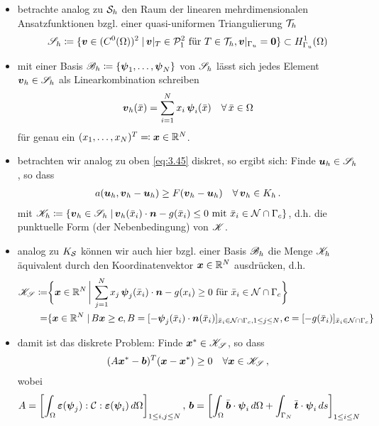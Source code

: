 \begin{itemize}
\item betrachte analog zu $\mathcal S_h$ den Raum der linearen mehrdimensionalen Ansatzfunktionen bzgl. einer quasi-uniformen Triangulierung $\mathcal T_h$
\begin{align}
	 \mathscr S_h \coloneqq \{\boldsymbol v \in (C^0(\Omega))^2 \;\vert\, \boldsymbol v|_T \in \mathcal P_1^2 \text{ für } T \in \mathcal T_h, \boldsymbol v|_{\Gamma_u} = \boldsymbol 0\} \subset H^1_{\Gamma_u} (\Omega)
\end{align}

\item mit einer Basis $\mathscr B_h \coloneqq \{\boldsymbol\psi_1,\ldots,\boldsymbol \psi_N\}$ von $\mathscr S_h$ lässt sich jedes Element $\boldsymbol v_h \in \mathscr S_h$ als Linearkombination schreiben
\begin{align}
	\boldsymbol v_h(\bar x) = \sum_{i = 1}^N x_i \, \boldsymbol \psi_i(\bar x) \quad \forall \, \bar x \in \Omega
\end{align}
für genau ein $(x_1,\ldots,x_N)^T \eqqcolon \boldsymbol x \in \mathbb{R}^N$.

\item betrachten wir analog zu oben \eqref{eq:3.45} diskret, so ergibt sich: Finde $\boldsymbol u_h \in \mathscr S_h$, so dass
\begin{align}
	a(\boldsymbol u_h, \boldsymbol v_h - \boldsymbol u_h) \ge F(\boldsymbol v_h- \boldsymbol u_h) \quad \forall \, \boldsymbol v_h \in K_h \, .
\end{align}
mit $\mathscr K_h \coloneqq \{  \boldsymbol v_h \in \mathscr S_h \;\vert\, \boldsymbol v_h(\bar x_i) \cdot \boldsymbol n - g(\bar x_i) \le 0 \text{ mit } \bar x_i \in \mathcal N \cap \Gamma_c\}$, d.h. die punktuelle Form (der Nebenbedingung) von $\mathscr K$.

\item analog zu $K_{\mathcal S}$ können wir auch hier bzgl. einer Basis $\mathscr B_h$ die Menge $\mathscr K_h$ äquivalent durch den Koordinatenvektor $\boldsymbol x \in \mathbb{R}^N$ ausdrücken, d.h.
\begin{align*}
	\mathscr K_{\mathscr S}  \coloneqq& \bigg\{ \boldsymbol x \in \mathbb{R}^N \,\bigg| \, \sum_{j=1}^N x_j \, \boldsymbol \psi_j(\bar x_i) \cdot \boldsymbol n- g(x_i) \ge 0 \text{ für } \bar x_i \in \mathcal N \cap \Gamma_c\bigg\} \\
	=& \{ \boldsymbol x \in \mathbb{R}^N \;\vert\, B\boldsymbol x \ge \boldsymbol c , B =  [-\boldsymbol \psi_j(\bar x_i)\cdot \boldsymbol n(\bar x_i)]_{\bar x_i \in \mathcal N \cap \Gamma_c, 1\le j \le N} ,\boldsymbol c = [-g(\bar x_i)]_{\bar x_i \in\mathcal N \cap \Gamma_c}\}
\end{align*}

\item damit ist das diskrete Problem: Finde $\boldsymbol x^* \in \mathscr K_{\mathscr S}$, so dass
\begin{align}\label{eq:3.50}
	(A\boldsymbol x^* - \boldsymbol b)^T (\boldsymbol x - \boldsymbol x^*) \ge 0 \quad \forall \boldsymbol x\in \mathscr K_{\mathscr S} \, ,
\end{align}
wobei
\begin{align*}
	A &= \left[\int_\Omega \boldsymbol {\varepsilon} (\boldsymbol \psi_j):\mathcal C:\boldsymbol {\varepsilon}(\boldsymbol \psi_i) \, d\Omega\right]_{1 \le i,j\le N} , \,  \boldsymbol b = \left[ \int_\Omega \bar{\boldsymbol b} \cdot \boldsymbol\psi_i \, d\Omega + \int_{\Gamma_N} \bar{\boldsymbol 	t} \cdot \boldsymbol\psi_i \, ds\right]_{1\le i \le N}
\end{align*}


\end{itemize}
